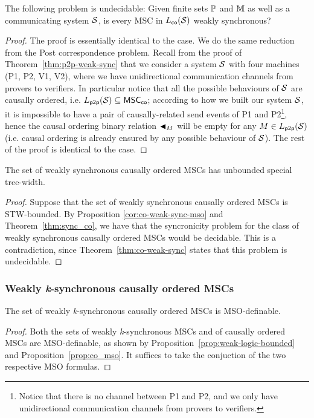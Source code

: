 \documentclass{article}
\begin{document}
\begin{theorem}\label{thm:co-weak-sync}
The following problem is undecidable:
Given finite sets $\mathbb{P}$ and $\mathbb{M}$ as well as a communicating system $\mathcal{S}$,
is every MSC in $L_{\mathsf{co}}(\mathcal{S})$ weakly synchronous?
\end{theorem}
\begin{proof}
The proof is essentially identical to the \pp case. We do the same reduction from the Post correspondence problem. Recall from the proof of Theorem~\ref{thm:p2p-weak-sync} that we consider a system $\mathcal{S}$ with four machines (P1, P2, V1, V2), where we have unidirectional communication channels from provers to verifiers. In particular notice that all the possible behaviours of $\mathcal{S}$ are causally ordered, i.e. $L_{\mathsf{p2p}}(\mathcal{S}) \subseteq \mathsf{MSC}_{\mathsf{co}}$; according to how we built our system $\mathcal{S}$, it is impossible to have a pair of causally-related send events of P1 and P2\footnote{Notice that there is no channel between P1 and P2, and we only have unidirectional communication channels from provers to verifiers.}, hence the causal ordering binary relation $\blacktriangleleft_M$ will be empty for any $M \in L_{\mathsf{p2p}}(\mathcal{S})$ (i.e. causal ordering is already ensured by any possible \pp behaviour of $\mathcal{S}$). The rest of the proof is identical to the \pp case.
\end{proof}

\begin{corollary}
The set of weakly synchronous causally ordered MSCs has unbounded special tree-width.
\end{corollary}
\begin{proof}
Suppose that the set of weakly synchronous causally ordered MSCs is STW-bounded. By Proposition \ref{cor:co-weak-sync-mso} and Theorem~\ref{thm:sync_co}, we have that the syncronicity problem for the class of weakly synchronous causally ordered MSCs would be decidable. This is a contradiction, since Theorem~\ref{thm:co-weak-sync} states that this problem is undecidable.
\end{proof}

\subsubsection{Weakly \emph{k}-synchronous causally ordered MSCs} 

\begin{proposition}\label{prop:co-weak-k-sync-mso}
The set of weakly \emph{k}-synchronous causally ordered MSCs is MSO-definable.
\end{proposition}
\begin{proof}
Both the sets of weakly \emph{k}-synchronous MSCs and of causally ordered MSCs are MSO-definable, as shown by Proposition~\ref{prop:weak-logic-bounded} and Proposition~\ref{prop:co_mso}. It suffices to take the conjuction of the two respective MSO formulas.
\end{proof}
\end{document}
